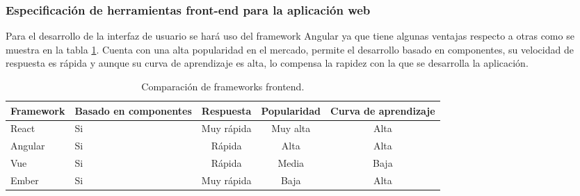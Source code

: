 
\subsubsection{Especificación de herramientas front-end para la aplicación web}

Para el desarrollo de la interfaz de usuario se hará uso del framework Angular ya que tiene algunas ventajas respecto a otras como se muestra en la tabla \ref{tabla:frameworks-frontend}. Cuenta con una alta popularidad en el mercado, permite el desarrollo basado en componentes, su velocidad de respuesta es rápida y aunque su curva de aprendizaje es alta, lo compensa la rapidez con la que se desarrolla la aplicación.

\begin{table}[H]
	\centering
	\caption{Comparación de frameworks frontend.}
	\label{tabla:frameworks-frontend}
	\begin{tabular}{|l|m{2.5cm}|c|c|c|}
		\hline
		\centering\textbf{Framework} &
		\centering\textbf{Basado en componentes} &
		\centering\textbf{Respuesta} &
		\centering\textbf{Popularidad} &
		\textbf{Curva de aprendizaje}
		\\ \hline
		React &
		\centering Si &
		Muy rápida &
		Muy alta &
		Alta
		\\ \hline
		\rowcolor{colorGrisClaro}
		Angular &
		\centering Si &
		Rápida &
		Alta &
		Alta
		\\ \hline
		Vue &
		\centering Si &
		Rápida &
		Media &
		Baja
		\\ \hline
		Ember &
		\centering Si &
		Muy rápida &
		Baja &
		Alta
		\\ \hline
	\end{tabular}
\end{table}